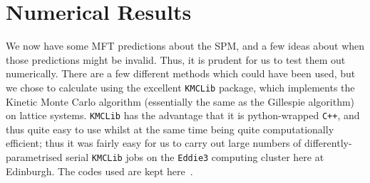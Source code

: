 \section{Numerical Results}
\label{sec:numRes}
We now have some MFT predictions about the SPM, and a few ideas about when those predictions might be invalid. Thus, it is prudent for us to test them out numerically.
There are a few different methods which could have been used, but we chose to calculate using the excellent \texttt{KMCLib}\cite{leetmaa2014kmclib} package, which implements the Kinetic Monte Carlo algorithm (essentially the same as the Gillespie algorithm)
on lattice systems. \texttt{KMCLib} has the advantage that it is python-wrapped \texttt{C++}, and thus quite easy to use whilst at the same time being quite computationally efficient; thus it was fairly easy for us to carry out large numbers
of differently-parametrised serial \texttt{KMCLib} jobs on the \texttt{Eddie3} computing cluster here at Edinburgh. The codes used are kept here~\cite{jHellGitRepo}.
